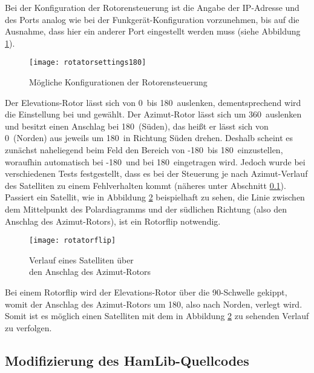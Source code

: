 Bei der Konfiguration der Rotorensteuerung ist die Angabe der IP-Adresse und des Ports analog wie bei der Funkgerät-Konfiguration vorzunehmen, bis auf die Ausnahme, dass hier ein anderer Port eingestellt werden muss (siehe Abbildung \ref{fig:rotatorconfig}). 

\begin{figure}[h]
	\centering
	\texttt{[image: rotatorsettings180]}
	\caption{Mögliche Konfigurationen der Rotorensteuerung}
	\label{fig:rotatorconfig} 
\end{figure}

Der Elevations-Rotor lässt sich von 0\mydegree\ bis 180\mydegree\ auslenken, dementsprechend wird die Einstellung bei  und  gewählt. Der Azimut-Rotor lässt sich um 360\mydegree\ auslenken und besitzt einen Anschlag bei 180\mydegree\ (Süden), das heißt er lässt sich von 0\mydegree\ (Norden) aus jeweils um 180\mydegree\ in Richtung Süden drehen. Deshalb scheint es zunächst naheliegend beim Feld  den Bereich von -180\mydegree\ bis 180\mydegree\ einzustellen, woraufhin automatisch bei  -180\mydegree\ und bei  180\mydegree\ eingetragen wird. Jedoch wurde bei verschiedenen Tests festgestellt, dass es bei der Steuerung je nach Azimut-Verlauf des Satelliten zu einem Fehlverhalten kommt (näheres unter Abschnitt \ref{chap:hamlibmod}). Passiert ein Satellit, wie in Abbildung \ref{fig:rotatorflip} beispielhaft zu sehen, die Linie zwischen dem Mittelpunkt des Polardiagramms und der südlichen Richtung (also den Anschlag des Azimut-Rotors), ist ein Rotorflip notwendig.

\begin{figure}[h]
	\centering
	\texttt{[image: rotatorflip]}
	\caption{Verlauf eines Satelliten über \\den Anschlag des Azimut-Rotors}
	\label{fig:rotatorflip} 
\end{figure}

\newpage

Bei einem Rotorflip wird der Elevations-Rotor über die 90\mydegree-Schwelle gekippt, womit der Anschlag des Azimut-Rotors um 180\mydegree, also nach Norden, verlegt wird. Somit ist es möglich einen Satelliten mit dem in Abbildung \ref{fig:rotatorflip} zu sehenden Verlauf zu verfolgen.

\subsection{Modifizierung des HamLib-Quellcodes}
\label{chap:hamlibmod}

